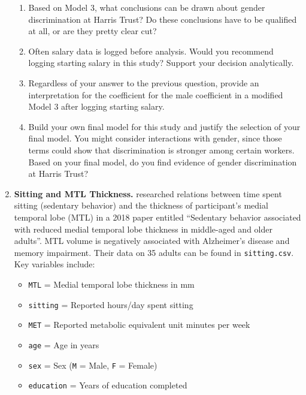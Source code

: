 \documentclass[
]{krantz}
\providecommand{\tightlist}{%
  \setlength{\itemsep}{0pt}\setlength{\parskip}{0pt}}
\begin{document}
\begin{enumerate}
\begin{enumerate}
  \item
    Based on Model 3, what conclusions can be drawn about gender discrimination at Harris Trust? Do these conclusions have to be qualified at all, or are they pretty clear cut?
  \item
    Often salary data is logged before analysis. Would you recommend logging starting salary in this study? Support your decision analytically.
  \item
    Regardless of your answer to the previous question, provide an interpretation for the coefficient for the male coefficient in a modified Model 3 after logging starting salary.
  \item
    Build your own final model for this study and justify the selection of your final model. You might consider interactions with gender, since those terms could show that discrimination is stronger among certain workers. Based on your final model, do you find evidence of gender discrimination at Harris Trust?\\
  \end{enumerate}
\item
  \textbf{Sitting and MTL Thickness.} \citet{Siddarth2018} researched relations between time spent sitting (sedentary behavior) and the thickness of participant's medial temporal lobe (MTL) in a 2018 paper entitled ``Sedentary behavior associated with reduced medial temporal lobe thickness in middle-aged and older adults''. MTL volume is negatively associated with Alzheimer's disease and memory impairment. Their data on 35 adults can be found in \texttt{sitting.csv}. Key variables include:

  \begin{itemize}
  \tightlist
  \item
    \texttt{MTL} = Medial temporal lobe thickness in mm
  \item
    \texttt{sitting} = Reported hours/day spent sitting
  \item
    \texttt{MET} = Reported metabolic equivalent unit minutes per week
  \item
    \texttt{age} = Age in years
  \item
    \texttt{sex} = Sex (\texttt{M} = Male, \texttt{F} = Female)
  \item
    \texttt{education} = Years of education completed
  \end{itemize}


\end{enumerate}
\end{document}
